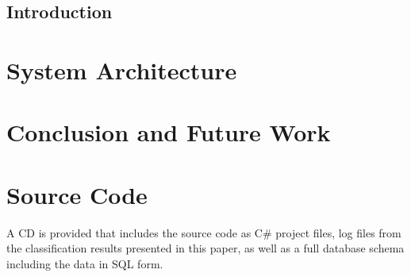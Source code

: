 \documentclass[phd,black]{PrincetonThesis}
\begin{document}
\section{Introduction}


\chapter{System Architecture}
\chapter{Conclusion and Future Work}
\par


\appendix
	
\cleardoublepage

\chapter{Source Code}
A CD is provided that includes the source code as C\# project files, log files from the classification results presented in this paper, as well as a full database schema including the data in SQL form.
	
\cleardoublepage
\nocite{*} %
	
\end{document}
